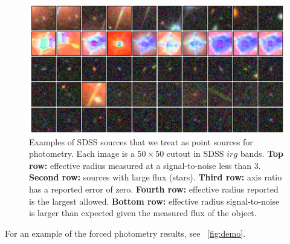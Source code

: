 \documentclass[12pt,preprint]{aastex}
\newcommand{\figref}[1]{\figurename~\ref{#1}}
\begin{document}
\begin{figure}[htb]
\begin{center}
\includegraphics[width=\textwidth]{ptsrc-05}
\end{center}
\caption{Examples of SDSS sources that we treat as point sources for
  photometry.  Each image is a $50 \times 50$ cutout in SDSS $irg$
  bands.
  \newline\hspace*{1em}
  \textbf{Top row:} effective radius measured at a signal-to-noise less than 3.  
  \newline\hspace*{1em}
  \textbf{Second row:} sources with large flux (stars).
  \newline\hspace*{1em}
  \textbf{Third row:} axis ratio has a reported error of zero.
  \newline\hspace*{1em}
  \textbf{Fourth row:} effective radius reported is the largest allowed.
  \newline\hspace*{1em}
  \textbf{Bottom row:} effective radius signal-to-noise is larger than expected given the measured flux of the object.
  \label{fig:ptsrc}
}
\end{figure}


For an example of the forced photometry results, see \figref{fig:demo}.
\end{document}
